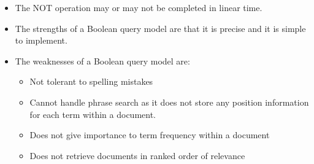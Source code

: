 \documentclass{article}
\begin{document}
\begin{itemize}
    \item The NOT operation may or may not be completed in linear time.
    
    \item The strengths of a Boolean query model are that it is precise and it is simple to implement. 
    
    \item The weaknesses of a Boolean query model are:
    \begin{itemize}
        \item Not tolerant to spelling mistakes
        
        \item Cannot handle phrase search as it does not store any position information for each term within a document. 
        
        \item Does not give importance to term frequency within a document
        
        \item Does not retrieve documents in ranked order of relevance
    \end{itemize}
\end{itemize}
\end{document}
